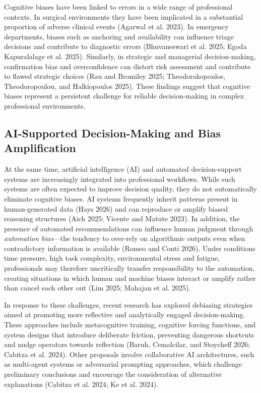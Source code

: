 \documentclass[
  letterpaper,
  DIV=11,
  numbers=noendperiod]{scrartcl}
\begin{document}
Cognitive biases have been linked to errors in a wide range of
professional contexts. In surgical environments they have been
implicated in a substantial proportion of adverse clinical events
(Agarwal et al. 2023). In emergency departments, biases such as
anchoring and availability can influence triage decisions and contribute
to diagnostic errors (Bhuvaneswari et al. 2025; Egoda Kapuralalage et
al. 2025). Similarly, in strategic and managerial decision-making,
confirmation bias and overconfidence can distort risk assessment and
contribute to flawed strategic choices (Rau and Bromiley 2025;
Theodorakopoulos, Theodoropoulou, and Halkiopoulos 2025). These findings
suggest that cognitive biases represent a persistent challenge for
reliable decision-making in complex professional environments.

\subsection{AI-Supported Decision-Making and Bias
Amplification}\label{ai-supported-decision-making-and-bias-amplification}

At the same time, artificial intelligence (AI) and automated
decision-support systems are increasingly integrated into professional
workflows. While such systems are often expected to improve decision
quality, they do not automatically eliminate cognitive biases. AI
systems frequently inherit patterns present in human-generated data
(Hays 2026) and can reproduce or amplify biased reasoning structures
(Aich 2025; Vicente and Matute 2023). In addition, the presence of
automated recommendations can influence human judgment through
\emph{automation bias}---the tendency to over-rely on algorithmic
outputs even when contradictory information is available (Romeo and
Conti 2026). Under conditions time pressure, high task complexity,
environmental stress and fatigue, professionals may therefore
uncritically transfer responsibility to the automation, creating
situations in which human and machine biases interact or amplify rather
than cancel each other out (Lim 2025; Mahajan et al. 2025).

In response to these challenges, recent research has explored debiasing
strategies aimed at promoting more reflective and analytically engaged
decision-making. These approaches include metacognitive training,
cognitive forcing functions, and system designs that introduce
deliberate friction, preventing dangerous shortcuts and nudge operators
towards reflection (Baruh, Cemalcilar, and Stoycheff 2026; Cabitza et
al. 2024). Other proposals involve collaborative AI architectures, such
as multi-agent systems or adversarial prompting approaches, which
challenge preliminary conclusions and encourage the consideration of
alternative explanations (Cabitza et al. 2024; Ke et al. 2024).
\end{document}
